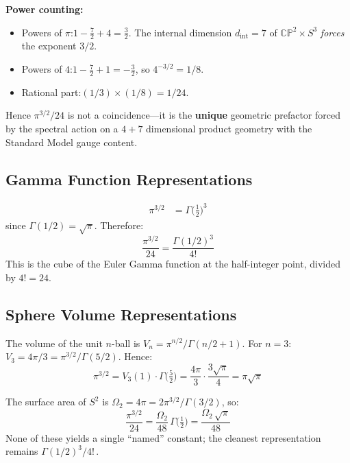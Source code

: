 \documentclass[11pt]{article}
\newcommand{\CP}{\mathbb{CP}}
\begin{document}
\noindent
\textbf{Power counting:}
\begin{itemize}
\item Powers of $\pi$:\quad $1 - \tfrac{7}{2} + 4 = \tfrac{3}{2}$.
      The internal dimension $d_{\mathrm{int}} = 7$ of $\CP^2 \times S^3$
      \emph{forces} the exponent $3/2$.
\item Powers of $4$:\quad $1 - \tfrac{7}{2} + 1 = -\tfrac{3}{2}$, so
      $4^{-3/2} = 1/8$.
\item Rational part:\quad $(1/3) \times (1/8) = 1/24$.
\end{itemize}
Hence $\pi^{3/2}/24$ is not a coincidence---it is the \textbf{unique}
geometric prefactor forced by the spectral action on a $4{+}7$ dimensional
product geometry with the Standard Model gauge content.

\subsection{Gamma Function Representations}

\begin{align}
\pi^{3/2} &= \Gamma\!\bigl(\tfrac{1}{2}\bigr)^3
\label{eq:gamma-cube}
\end{align}
since $\Gamma(1/2) = \sqrt{\pi}$.  Therefore:
\begin{equation}
\frac{\pi^{3/2}}{24} = \frac{\Gamma(1/2)^3}{4!}
\label{eq:gamma-factorial}
\end{equation}
This is the cube of the Euler Gamma function at the half-integer point,
divided by $4! = 24$.

\subsection{Sphere Volume Representations}

The volume of the unit $n$-ball is $V_n = \pi^{n/2}/\Gamma(n/2+1)$.
For $n = 3$: $V_3 = 4\pi/3 = \pi^{3/2}/\Gamma(5/2)$.  Hence:
\begin{equation}
\pi^{3/2} = V_3(1) \cdot \Gamma\!\bigl(\tfrac{5}{2}\bigr)
= \frac{4\pi}{3} \cdot \frac{3\sqrt{\pi}}{4}
= \pi\sqrt{\pi}
\end{equation}

The surface area of $S^2$ is $\Omega_2 = 4\pi = 2\pi^{3/2}/\Gamma(3/2)$, so:
\begin{equation}
\frac{\pi^{3/2}}{24} = \frac{\Omega_2}{48}\,\Gamma\!\bigl(\tfrac{1}{2}\bigr)
= \frac{\Omega_2\,\sqrt{\pi}}{48}
\end{equation}
None of these yields a single ``named'' constant; the cleanest representation
remains $\Gamma(1/2)^3/4!$\,.
\end{document}
